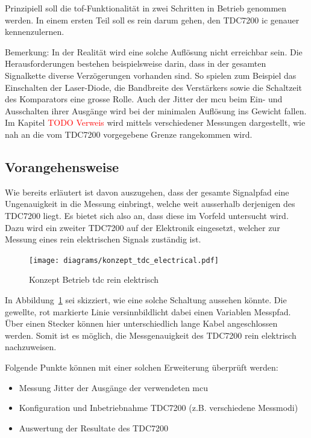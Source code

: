 \documentclass[11pt,a4paper,hidelinks]{article}
\begin{document}
Prinzipiell soll die \acrshort{tof}-Funktionalität in zwei Schritten in Betrieb genommen werden.
In einem ersten Teil soll es rein darum gehen, den TDC7200 \acrshort{ic} genauer
kennenzulernen.

Bemerkung: In der Realität wird eine solche Auflösung nicht erreichbar sein. Die Herausforderungen
bestehen beispielsweise darin, dass in der gesamten Signalkette diverse Verzögerungen vorhanden sind.
So spielen zum Beispiel das Einschalten der Laser-Diode, die Bandbreite des Verstärkers sowie
die Schaltzeit des Komparators eine grosse Rolle. Auch der Jitter der \acrshort{mcu} beim Ein- und Ausschalten
ihrer Ausgänge wird bei der minimalen Auflösung ins Gewicht fallen. Im Kapitel \textcolor{red}{TODO Verweis}
wird mittels verschiedener Messungen dargestellt, wie nah an die vom TDC7200 vorgegebene Grenze rangekommen wird.

\subsection{Vorangehensweise}\label{sec:approach}

Wie bereits erläutert ist davon auszugehen, dass der gesamte Signalpfad eine Ungenauigkeit in die Messung einbringt,
welche weit ausserhalb derjenigen des TDC7200 liegt. Es bietet sich also an, dass diese im Vorfeld untersucht wird.
Dazu wird ein zweiter TDC7200 auf der Elektronik eingesetzt, welcher zur Messung eines rein elektrischen Signals
zuständig ist.

\begin{figure}[H]
    \centering
    \texttt{[image: diagrams/konzept\_tdc\_electrical.pdf]}
    \caption{Konzept Betrieb \acrshort{tdc} rein elektrisch}\label{fig:konzept_tdc_electrical}
\end{figure}

In Abbildung~\ref{fig:konzept_tdc_electrical} sei skizziert, wie eine solche Schaltung aussehen könnte. Die gewellte,
rot markierte Linie versinnbildlicht dabei einen Variablen Messpfad. Über einen Stecker können hier unterschiedlich lange
Kabel angeschlossen werden. Somit ist es möglich, die Messgenauigkeit des TDC7200 rein elektrisch nachzuweisen.

Folgende Punkte können mit einer solchen Erweiterung überprüft werden:

\begin{itemize}
    \item Messung Jitter der Ausgänge der verwendeten \acrshort{mcu}
    \item Konfiguration und Inbetriebnahme TDC7200 (z.B. verschiedene Messmodi)
    \item Auswertung der Resultate des TDC7200
\end{itemize}
\end{document}
